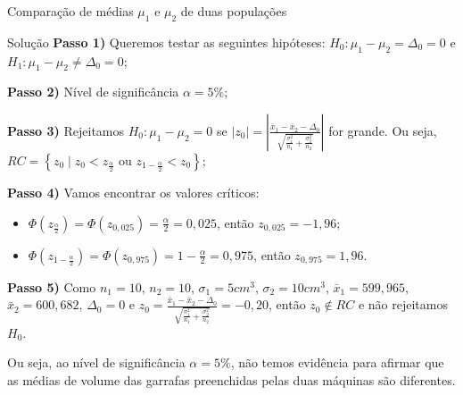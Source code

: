 \documentclass[9pt]{beamer}
\begin{document}
\begin{frame}{Comparação de médias $\mu_1$ e $\mu_2$ de duas populações}

\small
\begin{block}{Solução}
	\textbf{Passo 1)} Queremos testar as seguintes hipóteses: $H_0: \mu_1 - \mu_2 = \Delta_0 =0$ e $H_1: \mu_1 - \mu_2 \neq \Delta_0 = 0$;
	
	\textbf{Passo 2)} Nível de significância $\alpha=5\%$;
	
	\textbf{Passo 3)} Rejeitamos $H_0: \mu_1 - \mu_2 =0$ se $\lvert z_0 \rvert = \left\lvert \frac{\bar{x}_1 - \bar{x}_2 - \Delta_0}{\sqrt{ \frac{\sigma_1^2}{n_1} + \frac{\sigma_2^2}{n_2} }} \right\rvert$ for grande. Ou seja, $RC=\left\{ 
	 z_0 \mid z_0 < z_\frac{\alpha}{2} \mbox{ ou } z_{1-\frac{\alpha}{2}} < z_0  \right\}$;
	 
	\textbf{Passo 4)} Vamos encontrar os valores críticos:
	\begin{itemize}
		\item $\Phi\left( z_\frac{\alpha}{2} \right) = \Phi\left( z_{0,025} \right) = \frac{\alpha}{2} = 0,025$, então $z_{0,025} = -1,96$;
		\item $\Phi\left( z_{1-\frac{\alpha}{2}} \right) = \Phi\left( z_{0,975} \right) = 1 - \frac{\alpha}{2} = 0,975$, então $z_{0,975} = 1,96$.
	\end{itemize}
	 
	 \textbf{Passo 5)} Como $n_1=10$, $n_2=10$, $\sigma_1=5cm^3$, $\sigma_2=10cm^3$, $\bar{x}_1=599,965$, $\bar{x}_2=600,682 $, $\Delta_0 =0$ e $z_0=\frac{\bar{x}_1 - \bar{x}_2 - \Delta_0}{\sqrt{ \frac{\sigma_1^2}{n_1} + \frac{\sigma_2^2}{n_2} }}=-0,20$, então $z_0 \not\in RC$ e não rejeitamos $H_0$.
	 
	 Ou seja, ao nível de significância $\alpha=5\%$, não temos evidência para afirmar que as médias de volume das garrafas preenchidas pelas duas máquinas são diferentes.
\end{block}
\normalsize

\end{frame}
\end{document}

